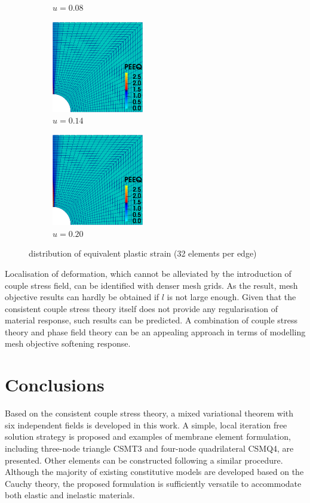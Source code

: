 \documentclass[3p,sort&compress,11pt,fleqn]{elsarticle}
\begin{document}
\begin{figure}[ht]
\begin{subfigure}[b]{.33\textwidth}
\caption{$u=\num{0.08}$}
\end{subfigure}\hfill
\begin{subfigure}[b]{.33\textwidth}\centering
\includegraphics[width=4cm]{PIC/P3270}
\caption{$u=\num{0.14}$}
\end{subfigure}\hfill
\begin{subfigure}[b]{.33\textwidth}\centering
\includegraphics[width=4cm]{PIC/P32100}
\caption{$u=\num{0.20}$}
\end{subfigure}
\caption{distribution of equivalent plastic strain (32 elements per edge)}\label{fig:peeq32}
\end{figure}
Localisation of deformation, which cannot be alleviated by the introduction of couple stress field, can be identified with denser mesh grids. As the result, mesh objective results can hardly be obtained if $l$ is not large enough. Given that the consistent couple stress theory itself does not provide any regularisation of material response, such results can be predicted. A combination of couple stress theory and phase field theory \citep{Bourdin2008} can be an appealing approach in terms of modelling mesh objective softening response.
\section{Conclusions}
Based on the consistent couple stress theory, a mixed variational theorem with six independent fields is developed in this work. A simple, local iteration free solution strategy is proposed and examples of membrane element formulation, including three-node triangle CSMT3 and four-node quadrilateral CSMQ4, are presented. Other elements can be constructed following a similar procedure. Although the majority of existing constitutive models are developed based on the Cauchy theory, the proposed formulation is sufficiently versatile to accommodate both elastic and inelastic materials.
\end{document}
